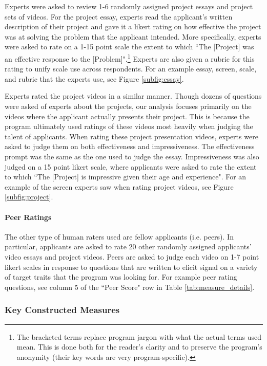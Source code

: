 Experts were asked to review 1-6 randomly assigned project essays and project sets of videos. For the project essay, experts read the applicant's written description of their project and gave it a likert rating on how effective the project was at solving the problem that the applicant intended. More specifically, experts were asked to rate on a 1-15 point scale the extent to which ``The [Project] was an effective response to the [Problem]".\footnote{The bracketed terms replace program jargon with what the actual terms used mean. This is done both for the reader's clarity and to preserve the program's anonymity (their key words are very program-specific).} Experts are also given a rubric for this rating to unify scale use across respondents. For an example essay, screen, scale, and rubric that the experts use, see Figure \ref{subfig:essay}. 

Experts rated the project videos in a similar manner. Though dozens of questions were asked of experts about the projects, our analysis focuses primarily on the videos where the applicant actually presents their project. This is because the program ultimately used ratings of these videos most heavily when judging the talent of applicants. When rating these project presentation videos, experts were asked to judge them on both effectiveness and impressiveness. The effectiveness prompt was the same as the one used to judge the essay. Impressiveness was also judged on a 15 point likert scale, where applicants were asked to rate the extent to which ``The [Project] is impressive given their age and experience". For an example of the screen experts saw when rating project videos, see Figure \ref{subfig:project}. 

\paragraph{Peer Ratings}
The other type of human raters used are fellow applicants (i.e. peers). In particular, applicants are asked to rate 20 other randomly assigned applicants' video essays and project videos. Peers are asked to judge each video on 1-7 point likert scales in response to questions that are written to elicit signal on a variety of target traits that the program was looking for. For example peer rating questions, see column 5 of the ``Peer Score" row in Table \ref{tab:measure_details}. 

\subsubsection{Key Constructed Measures}

